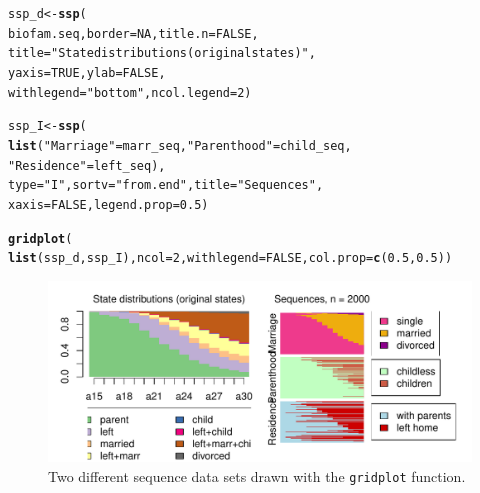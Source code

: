 \documentclass[12pt]{article}\usepackage[]{graphicx}\usepackage[]{color}
\makeatletter
\def\maxwidth{ %
  \ifdim\Gin@nat@width>\linewidth
    \linewidth
  \else
    \Gin@nat@width
  \fi
}
\newcommand{\hlnum}[1]{\textcolor[rgb]{0.686,0.059,0.569}{#1}}%
\newcommand{\hlstr}[1]{\textcolor[rgb]{0.192,0.494,0.8}{#1}}%
\newcommand{\hlstd}[1]{\textcolor[rgb]{0.345,0.345,0.345}{#1}}%
\newcommand{\hlkwb}[1]{\textcolor[rgb]{0.69,0.353,0.396}{#1}}%
\newcommand{\hlkwc}[1]{\textcolor[rgb]{0.333,0.667,0.333}{#1}}%
\newcommand{\hlkwd}[1]{\textcolor[rgb]{0.737,0.353,0.396}{\textbf{#1}}}%
\newenvironment{kframe}{%
 \def\at@end@of@kframe{}%
 \ifinner\ifhmode%
  \def\at@end@of@kframe{\end{minipage}}%
  \begin{minipage}{\columnwidth}%
 \fi\fi%
 \def\FrameCommand##1{\hskip\@totalleftmargin \hskip-\fboxsep
 \colorbox{shadecolor}{##1}\hskip-\fboxsep
     \hskip-\linewidth \hskip-\@totalleftmargin \hskip\columnwidth}%
 \MakeFramed {\advance\hsize-\width
   \@totalleftmargin\z@ \linewidth\hsize
   \@setminipage}}%
 {\par\unskip\endMakeFramed%
 \at@end@of@kframe}
\newenvironment{knitrout}{}{} %
\makeatother
\begin{document}
\begin{knitrout}
\color{fgcolor}\begin{kframe}
\begin{alltt}
\hlstd{ssp_d} \hlkwb{<-} \hlkwd{ssp}\hlstd{(}
  \hlstd{biofam.seq,} \hlkwc{border} \hlstd{=} \hlnum{NA}\hlstd{,} \hlkwc{title.n} \hlstd{=} \hlnum{FALSE}\hlstd{,}
  \hlkwc{title} \hlstd{=} \hlstr{"State distributions (original states)"}\hlstd{,}
  \hlkwc{yaxis} \hlstd{=} \hlnum{TRUE}\hlstd{,} \hlkwc{ylab} \hlstd{=} \hlnum{FALSE}\hlstd{,}
  \hlkwc{withlegend} \hlstd{=} \hlstr{"bottom"}\hlstd{,} \hlkwc{ncol.legend} \hlstd{=} \hlnum{2}\hlstd{)}

\hlstd{ssp_I} \hlkwb{<-} \hlkwd{ssp}\hlstd{(}
  \hlkwd{list}\hlstd{(}\hlstr{"Marriage"} \hlstd{= marr_seq,} \hlstr{"Parenthood"} \hlstd{= child_seq,}
       \hlstr{"Residence"} \hlstd{= left_seq),}
  \hlkwc{type} \hlstd{=} \hlstr{"I"}\hlstd{,} \hlkwc{sortv} \hlstd{=} \hlstr{"from.end"}\hlstd{,} \hlkwc{title} \hlstd{=} \hlstr{"Sequences"}\hlstd{,}
  \hlkwc{xaxis} \hlstd{=} \hlnum{FALSE}\hlstd{,} \hlkwc{legend.prop} \hlstd{=} \hlnum{0.5}\hlstd{)}

\hlkwd{gridplot}\hlstd{(}
  \hlkwd{list}\hlstd{(ssp_d, ssp_I),} \hlkwc{ncol} \hlstd{=} \hlnum{2}\hlstd{,} \hlkwc{withlegend} \hlstd{=} \hlnum{FALSE}\hlstd{,} \hlkwc{col.prop} \hlstd{=} \hlkwd{c}\hlstd{(}\hlnum{0.5}\hlstd{,} \hlnum{0.5}\hlstd{))}
\end{alltt}
\end{kframe}\begin{figure}

{\centering \includegraphics[width=\maxwidth]{figure/gridplot2-1} 

}

\caption[Two different sequence data sets drawn with the \texttt{gridplot} function]{Two different sequence data sets drawn with the \texttt{gridplot} function.}\label{fig:gridplot2}
\end{figure}


\end{knitrout}
\end{document}
